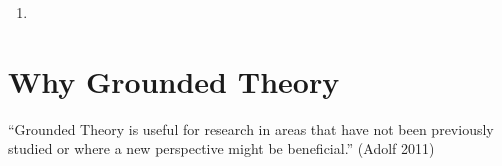 \begin{enumerate}
	\item
\end{enumerate}


\section{Why Grounded Theory}
“Grounded Theory is useful for research in areas that have not been previously studied or where a new perspective might be beneficial.” (Adolf 2011)